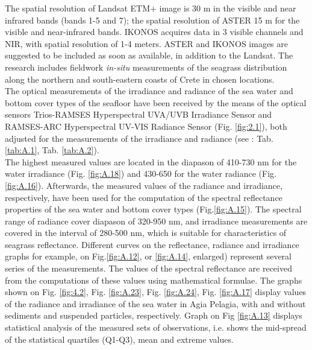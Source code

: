 \documentclass[10pt, a4paper]{article}
\begin{document}
The spatial resolution of Landsat ETM+ image is 30 m in the visible and near infrared bands (bands
1-5 and 7); the spatial resolution of ASTER 15 m for the visible and near-infrared bands. IKONOS
acquires data in 3 visible channels and NIR, with spatial resolution of 1-4 meters. ASTER and
IKONOS images are suggested to be included as soon as available, in addition to the Landsat. The
research includes fieldwork \textit{in-situ} measurements of the seagrass distribution along the northern and
south-eastern coasts of Crete in chosen locations.\\
The optical measurements of the irradiance and radiance of the sea water and bottom cover types of
the seafloor have been received by the means of the optical sensors Trios-RAMSES Hyperspectral
UVA/UVB Irradiance Sensor and RAMSES-ARC Hyperspectral UV-VIS Radiance Sensor (Fig. \ref{fig:2.1}), both adjusted for the measurements of the irradiance and radiance (see : Tab. \ref{tab:A.1}, Tab. \ref{tab:A.2}). \\
The highest measured values are located in the diapason of 410-730 nm for the water irradiance (Fig. \ref{fig:A.18}) and 430-650 for the water radiance (Fig.\ref{fig:A.16}). 
Afterwards, the measured values of the radiance and irradiance, respectively, have been used for the computation of the spectral reflectance
properties of the sea water and bottom cover types (Fig.\ref{fig:A.15}). The spectral range of radiance
cover diapason of 320-950 nm, and irradiance measurements are covered in the interval of 280-500
nm, which is suitable for characteristics of seagrass reflectance.
Different curves on the reflectance, radiance and irradiance graphs for example, on Fig.\ref{fig:A.12}, or \ref{fig:A.14}, enlarged) represent several series of
the measurements. The values of the spectral reflectance are received from the
computations of these values using mathematical formulae. The graphs shown on Fig. \ref{fig:4.2}, Fig. \ref{fig:A.23}, Fig. \ref{fig:A.24}, Fig. \ref{fig:A.17} display values of the radiance and irradiance of the sea water in Agia Pelagia, with and without sediments and suspended particles, respectively. Graph on Fig \ref{fig:A.13} displays statistical analysis of the measured sets of observations, i.e. shows the mid-spread of the statistical quartiles (Q1-Q3), mean and extreme values.
\end{document}
